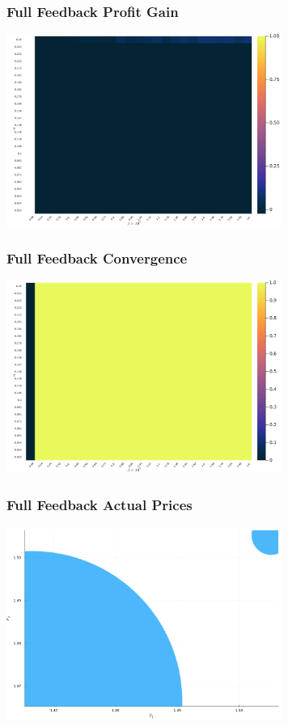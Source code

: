 \documentclass{beamer}
\begin{document}
	\begin{frame}\frametitle{Full Feedback Profit Gain}
\begin{center}
	\includegraphics[width=9cm]{heatmap_profit_gain_small_full_feedback.png}
\end{center}
\end{frame}
\begin{frame}\frametitle{Full Feedback Convergence}
\begin{center}
	\includegraphics[width=9cm]{heatmap_convergence_counts_small_full_feedback.png}
\end{center}
\end{frame}
\begin{frame}\frametitle{Full Feedback Actual Prices}
\begin{center}
	\includegraphics[width=9cm]{scatter_plot_prices_small_full_feedback.png}
\end{center}
\end{frame}
\end{document}
